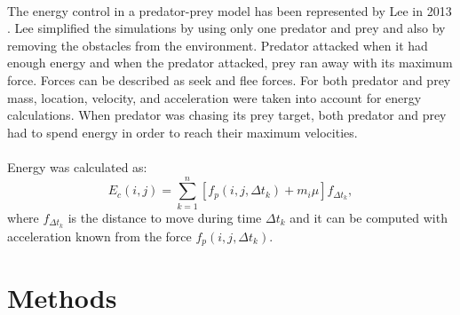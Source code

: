 \documentclass[internal]{FRIreport}
\begin{document}
~\\
The energy control in a predator-prey model has been represented by Lee in 2013 \cite{lee2013evaluation}. Lee simplified the simulations by using only one predator and prey and also by removing the obstacles from the environment. Predator attacked when it had enough energy and when the predator attacked, prey ran away with its maximum force. Forces can be described as seek and flee forces. For both predator and prey mass, location, velocity, and acceleration were taken into account for energy calculations. When predator was chasing its prey target, both predator and prey had to spend energy in order to reach their maximum velocities.\\\\
Energy was calculated as: \\
\begin{equation} \label{eq:energy}
E_{c}(i,j) = \sum\limits_{k=1}^n [ f_{p}(i,j, \Delta t_{k}) + m_{i} \mu  ] f_{ \Delta t_{k}}, 
\end{equation}
where $f_{ \Delta t_{k}}$ is the distance to move during time $\Delta t_{k}$ and it can be computed with acceleration known from the force $f_{p}(i,j, \Delta t_{k})$.


\section{Methods}
\end{document}
